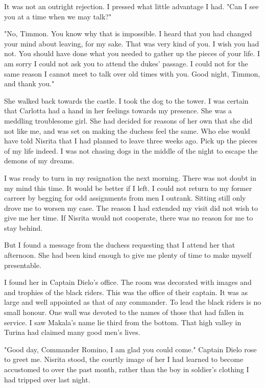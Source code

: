 \documentclass{article}
\begin{document}
It was not an outright rejection. I pressed what little advantage I had. "Can I see you at a time when we may talk?" 

"No, Timmon. You know why that is impossible. I heard that you had changed your mind about leaving, for my sake. That was very kind of you. I wish you had not. You should have done what you needed to gather up the pieces of your life. I am sorry I could not ask you to attend the dukes' passage. I could not for the same reason I cannot meet to talk over old times with you. Good night, Timmon, and thank you."

She walked back towards the castle. I took the dog to the tower. I was certain that Carlotta had a hand in her feelings towards my presence. She was a meddling troublesome girl. She had decided for reasons of her own that she did not like me, and was set on making the duchess feel the same. Who else would have told Nisrita that I had planned to leave three weeks ago. Pick up the pieces of my life indeed. I was not chasing dogs in the middle of the night to escape the demons of my dreams.

\vspace{.5 cm}

I was ready to turn in my resignation the next morning. There was not doubt in my mind this time. It would be better if I left. I could not return to my former carreer by begging for odd assignments from men I outrank. Sitting still only drove me to worsen my case. The reason I had extended my visit did not wish to give me her time. If Nisrita would not cooperate, there was no reason for me to stay behind.

But I found a message from the duchess requesting that I attend her that afternoon. She had been kind enough to give me plenty of time to make myself presentable. 

I found her in Captain Dielo's office. The room was decorated with images and and trophies of the black riders. This was the office of their captain. It was as large and well appointed as that of any commander. To lead the black riders is no small honour. One wall was devoted to the names of those that had fallen in service. I saw Makala's name lie third from the bottom. That high valley in Turina had claimed many good men's lives. 

"Good day, Commander Romino, I am glad you could come." Captain Dielo rose to greet me. Nisrita stood, the courtly image of her I had learned to become accustomed to over the past month, rather than the boy in soldier's clothing I had tripped over last night.
\end{document}

